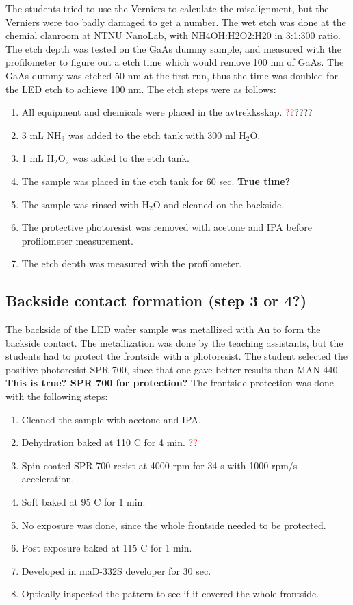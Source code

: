 The students tried to use the Verniers to calculate the misalignment, but the Verniers were too badly damaged to get a number.
The wet etch was done at the chemial clanroom at NTNU NanoLab, with NH4OH:H2O2:H20 in 3:1:300 ratio.
The etch depth was tested on the GaAs dummy sample, and measured with the profilometer to figure out a etch time which would remove 100 nm of GaAs.
The GaAs dummy was etched 50 nm at the first run, thus the time was doubled for the LED etch to achieve 100 nm.
The etch steps were as follows:

\begin{enumerate}
    \item All equipment and chemicals were placed in the avtrekksskap. \textcolor{red}{??}????
    \item 3 mL NH$_3$ was added to the etch tank with 300 ml H$_2$O.
    \item 1 mL H$_2$O$_2$ was added to the etch tank.
    \item The sample was placed in the etch tank for 60 sec. \textbf{True time?}
    \item The sample was rinsed with H$_2$O and cleaned on the backside.
    \item The protective photoresist was removed with acetone and IPA before profilometer measurement.
    \item The etch depth was measured with the profilometer.
\end{enumerate}



\subsection{Backside contact formation (step 3 or 4?)}
\label{methods:backside_metallization}
The backside of the LED wafer sample was metallized with Au to form the backside contact.
The metallization was done by the teaching assistants, but the students had to protect the frontside with a photoresist.
The student selected the positive photoresist SPR 700, since that one gave better results than MAN 440.
\textbf{This is true? SPR 700 for protection?}
The frontside protection was done with the following steps:
\begin{enumerate}
    \item Cleaned the sample with acetone and IPA.
    \item Dehydration baked at 110 \textdegree C for 4 min. \textcolor{red}{??}
    \item Spin coated SPR 700 resist at 4000 rpm for 34 s with 1000 rpm/s acceleration.
    \item Soft baked at 95 \textdegree C for 1 min.
    \item No exposure was done, since the whole frontside needed to be protected.
    \item Post exposure baked at 115 \textdegree C for 1 min.
    \item Developed in maD-332S developer for 30 sec.
    \item Optically inspected the pattern to see if it covered the whole frontside.
\end{enumerate}


